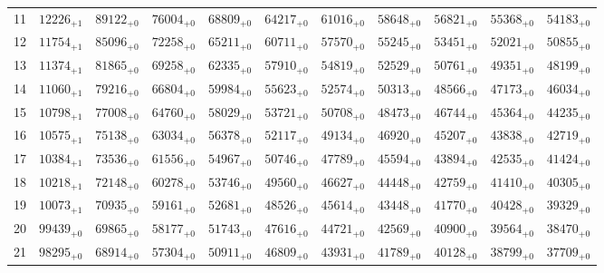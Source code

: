 \documentclass[10pt, a4paper]{article}
\begin{document}
\begin{center}
\begin{tabular}{c || c c c c c | c c c c c}
        \hline
        11 & \({12226}_{+1}\) & \({89122}_{+0}\) & \({76004}_{+0}\) & \({68809}_{+0}\) & \({64217}_{+0}\) & \({61016}_{+0}\) & \({58648}_{+0}\) & \({56821}_{+0}\) & \({55368}_{+0}\) & \({54183}_{+0}\)\\
        12 & \({11754}_{+1}\) & \({85096}_{+0}\) & \({72258}_{+0}\) & \({65211}_{+0}\) & \({60711}_{+0}\) & \({57570}_{+0}\) & \({55245}_{+0}\) & \({53451}_{+0}\) & \({52021}_{+0}\) & \({50855}_{+0}\)\\
        13 & \({11374}_{+1}\) & \({81865}_{+0}\) & \({69258}_{+0}\) & \({62335}_{+0}\) & \({57910}_{+0}\) & \({54819}_{+0}\) & \({52529}_{+0}\) & \({50761}_{+0}\) & \({49351}_{+0}\) & \({48199}_{+0}\)\\
        14 & \({11060}_{+1}\) & \({79216}_{+0}\) & \({66804}_{+0}\) & \({59984}_{+0}\) & \({55623}_{+0}\) & \({52574}_{+0}\) & \({50313}_{+0}\) & \({48566}_{+0}\) & \({47173}_{+0}\) & \({46034}_{+0}\)\\
        15 & \({10798}_{+1}\) & \({77008}_{+0}\) & \({64760}_{+0}\) & \({58029}_{+0}\) & \({53721}_{+0}\) & \({50708}_{+0}\) & \({48473}_{+0}\) & \({46744}_{+0}\) & \({45364}_{+0}\) & \({44235}_{+0}\)\\
        \hline
        16 & \({10575}_{+1}\) & \({75138}_{+0}\) & \({63034}_{+0}\) & \({56378}_{+0}\) & \({52117}_{+0}\) & \({49134}_{+0}\) & \({46920}_{+0}\) & \({45207}_{+0}\) & \({43838}_{+0}\) & \({42719}_{+0}\)\\
        17 & \({10384}_{+1}\) & \({73536}_{+0}\) & \({61556}_{+0}\) & \({54967}_{+0}\) & \({50746}_{+0}\) & \({47789}_{+0}\) & \({45594}_{+0}\) & \({43894}_{+0}\) & \({42535}_{+0}\) & \({41424}_{+0}\)\\
        18 & \({10218}_{+1}\) & \({72148}_{+0}\) & \({60278}_{+0}\) & \({53746}_{+0}\) & \({49560}_{+0}\) & \({46627}_{+0}\) & \({44448}_{+0}\) & \({42759}_{+0}\) & \({41410}_{+0}\) & \({40305}_{+0}\)\\
        19 & \({10073}_{+1}\) & \({70935}_{+0}\) & \({59161}_{+0}\) & \({52681}_{+0}\) & \({48526}_{+0}\) & \({45614}_{+0}\) & \({43448}_{+0}\) & \({41770}_{+0}\) & \({40428}_{+0}\) & \({39329}_{+0}\)\\
        20 & \({99439}_{+0}\) & \({69865}_{+0}\) & \({58177}_{+0}\) & \({51743}_{+0}\) & \({47616}_{+0}\) & \({44721}_{+0}\) & \({42569}_{+0}\) & \({40900}_{+0}\) & \({39564}_{+0}\) & \({38470}_{+0}\)\\
        \hline
        21 & \({98295}_{+0}\) & \({68914}_{+0}\) & \({57304}_{+0}\) & \({50911}_{+0}\) & \({46809}_{+0}\) & \({43931}_{+0}\) & \({41789}_{+0}\) & \({40128}_{+0}\) & \({38799}_{+0}\) & \({37709}_{+0}\)\\

\end{tabular}
\end{center}
\end{document}
